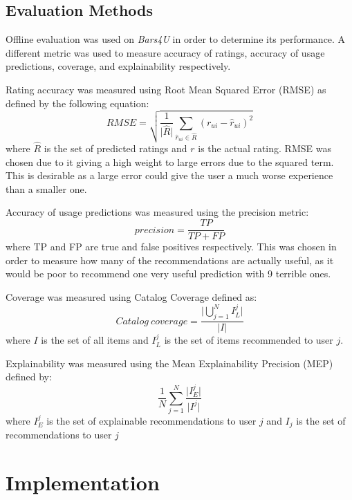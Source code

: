 \documentclass[conference]{IEEEtran}
\begin{document}
\subsection{Evaluation Methods}
Offline evaluation was used on \textit{Bars4U} in order to determine its performance. A different metric was used to measure accuracy of ratings, accuracy of usage predictions, coverage, and explainability respectively.
\par
Rating accuracy was measured using Root Mean Squared Error (RMSE) as defined by the following equation:
\begin{equation}
    RMSE=\sqrt{\frac{1}{\lvert\hat{R}\rvert}\sum_{\hat{r}_{ui}\in\hat{R}}(r_{ui}-\hat{r}_{ui})^{2}}
\end{equation}
where $\hat{R}$ is the set of predicted ratings and $r$ is the actual rating. RMSE was chosen due to it giving a high weight to large errors due to the squared term. This is desirable as a large error could give the user a much worse experience than a smaller one.
\par
Accuracy of usage predictions was measured using the precision metric:
\begin{equation}
    precision=\frac{TP}{TP+FP}
\end{equation}
where TP and FP are true and false positives respectively. This was chosen in order to measure how many of the recommendations are actually useful, as it would be poor to recommend one very useful prediction with 9 terrible ones.
\par
Coverage was measured using Catalog Coverage defined as:
\begin{equation}
    Catalog\ coverage=
    \frac
    {\lvert\bigcup_{j=1}^{N}I_{L}^{j}\rvert}
    {\lvert I \rvert}
\end{equation}
where $I$ is the set of all items and $I_{L}^{j}$ is the set of items recommended to user $j$.
\par
Explainability was measured using the Mean Explainability Precision (MEP)\cite{b14} defined by:
\begin{equation}
    \frac{1}{N}
    \sum_{j=1}^{N}
    \frac{\lvert I_{E}^{j}\rvert}{\lvert I^{j}\rvert}
\end{equation}
where $I_{E}^{j}$ is the set of explainable recommendations to user $j$ and $I_{j}$ is the set of recommendations to user $j$
\section{Implementation}
\end{document}
